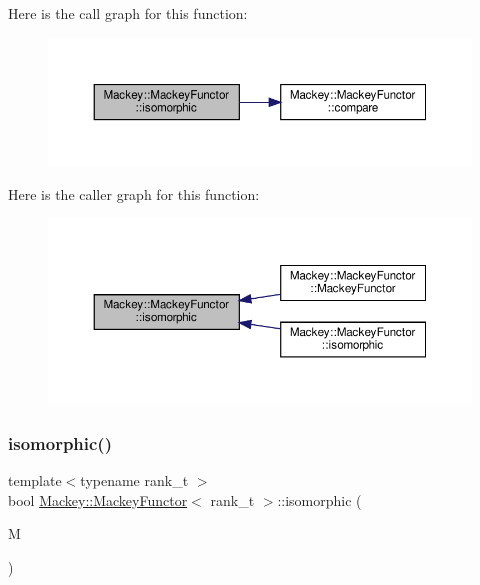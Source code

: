 Here is the call graph for this function\+:\nopagebreak
\begin{figure}[H]
\begin{center}
\leavevmode
\includegraphics[width=350pt]{classMackey_1_1MackeyFunctor_a8cd5c9415c0c63c6d79dfa9b0067f416_cgraph}
\end{center}
\end{figure}
Here is the caller graph for this function\+:\nopagebreak
\begin{figure}[H]
\begin{center}
\leavevmode
\includegraphics[width=350pt]{classMackey_1_1MackeyFunctor_a8cd5c9415c0c63c6d79dfa9b0067f416_icgraph}
\end{center}
\end{figure}
\mbox{\label{classMackey_1_1MackeyFunctor_af183c1f4d1558bc3c7dc75dcf8161ee8}} 
\subsubsection{\texorpdfstring{isomorphic()}{isomorphic()}\hspace{0.1cm}{\footnotesize\ttfamily [2/2]}}
{\footnotesize\ttfamily template$<$typename rank\+\_\+t $>$ \\
bool \hyperlink{classMackey_1_1MackeyFunctor}{Mackey\+::\+Mackey\+Functor}$<$ rank\+\_\+t $>$\+::isomorphic (\begin{DoxyParamCaption}\item[{const \hyperlink{classMackey_1_1MackeyFunctor}{Mackey\+Functor}$<$ rank\+\_\+t $>$ \&}]{M }\end{DoxyParamCaption})}



